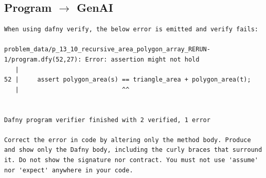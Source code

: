 \documentclass{article}
\begin{document}
\subsection*{Program $\rightarrow$ GenAI}
\begin{lstlisting}
When using dafny verify, the below error is emitted and verify fails:

problem_data/p_13_10_recursive_area_polygon_array_RERUN-1/program.dfy(52,27): Error: assertion might not hold
   |
52 |     assert polygon_area(s) == triangle_area + polygon_area(t);
   |                            ^^


Dafny program verifier finished with 2 verified, 1 error

Correct the error in code by altering only the method body. Produce and show only the Dafny body, including the curly braces that surround it. Do not show the signature nor contract. You must not use 'assume' nor 'expect' anywhere in your code.
\end{lstlisting}
\end{document}
